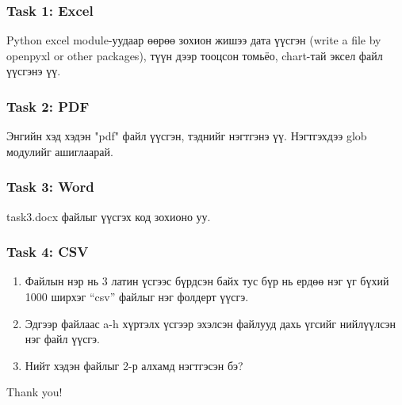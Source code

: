 \documentclass{beamer}
\begin{document}
\begin{frame}
    \frametitle{Task 1: Excel}
    Python excel module-уудаар өөрөө зохион жишээ дата үүсгэн 
    (write a file by openpyxl or other packages), түүн дээр тооцсон томьёо, chart-тай эксел файл үүсгэнэ үү.
\end{frame}

\begin{frame}
    \frametitle{Task 2: PDF}
    Энгийн хэд хэдэн "pdf" файл үүсгэн, тэднийг нэгтгэнэ үү. Нэгтгэхдээ glob модулийг ашиглаарай.
\end{frame}

\begin{frame}
    \frametitle{Task 3: Word}
    task3.docx файлыг үүсгэх код зохионо уу. 
\end{frame}

\begin{frame}
    \frametitle{Task 4: CSV}
    \begin{enumerate}
        \item Файлын нэр нь 3 латин үсгээс бүрдсэн байх тус бүр нь ердөө нэг үг бүхий 1000 ширхэг “csv” файлыг нэг фолдерт үүсгэ. 
        \item Эдгээр файлаас a-h хүртэлх үсгээр эхэлсэн файлууд дахь үгсийг нийлүүлсэн нэг файл үүсгэ. 
        \item Нийт хэдэн файлыг 2-р алхамд нэгтгэсэн бэ?
    \end{enumerate}
    
\end{frame}


\begin{frame}
\Huge{\centerline{Thank you!}}
\end{frame}

\end{document}
